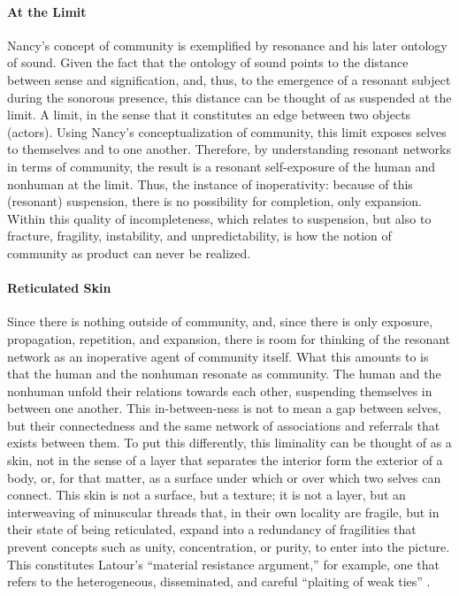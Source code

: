 \paragraph{At the Limit}
Nancy's concept of community is exemplified by resonance and his later ontology of sound. Given the fact that the ontology of sound points to the distance between sense and signification, and, thus, to the emergence of a resonant subject during the sonorous presence, this distance can be thought of as suspended at the limit. A limit, in the sense that it constitutes an edge between two objects (actors). Using Nancy's conceptualization of community, this limit exposes selves to themselves and to one another. Therefore, by understanding resonant networks in terms of community, the result is a resonant self-exposure of the human and nonhuman at the limit. Thus, the instance of inoperativity: because of this (resonant) suspension, there is no possibility for completion, only expansion. Within this quality of incompleteness, which relates to suspension, but also to fracture, fragility, instability, and unpredictability, is how the notion of community as product can never be realized.

\paragraph{Reticulated Skin}
Since there is nothing outside of community, and, since there is only exposure, propagation, repetition, and expansion, there is room for thinking of the resonant network as an inoperative agent of community itself. What this amounts to is that the human and the nonhuman resonate as community. The human and the nonhuman unfold their relations towards each other, suspending themselves in between one another. This in-between-ness is not to mean a gap between selves, but their connectedness and the same network of associations and referrals that exists between them. To put this differently, this liminality can be thought of as a skin, not in the sense of a layer that separates the interior form the exterior of a body, or, for that matter, as a surface under which or over which two selves can connect. This skin is not a surface, but a texture; it is not a layer, but an interweaving of minuscular threads that, in their own locality are fragile, but in their state of being reticulated, expand into a redundancy of fragilities that prevent concepts such as unity, concentration, or purity, to enter into the picture. This constitutes Latour's ``material resistance argument,'' for example, one that refers to the heterogeneous, disseminated, and careful ``plaiting of weak ties'' \parencite[3]{Lat90:On}.

